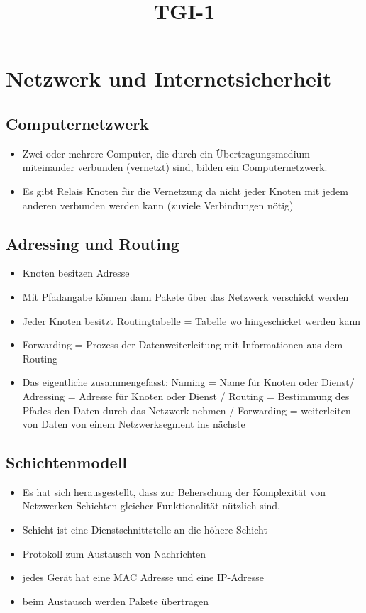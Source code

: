 \documentclass[a4paper,10pt]{scrartcl}
\title{TGI-1}
\author{}
\begin{document}
\section{Netzwerk und Internetsicherheit}

\subsection{Computernetzwerk}

\begin{itemize}
 \item Zwei oder mehrere Computer, die durch ein
Übertragungsmedium miteinander verbunden (vernetzt) sind, bilden ein Computernetzwerk. 
\item Es gibt Relais Knoten für die Vernetzung da nicht jeder Knoten mit jedem anderen verbunden werden kann (zuviele Verbindungen nötig)
\end{itemize}

\subsection{Adressing und Routing}

\begin{itemize}
 \item Knoten besitzen Adresse
 \item Mit Pfadangabe können dann Pakete über das Netzwerk verschickt werden
 \item Jeder Knoten besitzt Routingtabelle = Tabelle wo hingeschicket werden kann
 \item Forwarding = Prozess der Datenweiterleitung mit Informationen aus dem Routing
 \item Das eigentliche zusammengefasst: Naming = Name für Knoten oder Dienst/ Adressing = Adresse für Knoten oder Dienst / Routing = Bestimmung des Pfades den Daten durch
 das Netzwerk nehmen / Forwarding = weiterleiten von Daten von einem Netzwerksegment ins nächste
\end{itemize}

\subsection{Schichtenmodell}

\begin{itemize}
 \item Es hat sich herausgestellt, dass zur Beherschung der Komplexität von Netzwerken Schichten gleicher Funktionalität nützlich sind.
 \item Schicht ist eine Dienstschnittstelle an die höhere Schicht
 \item Protokoll zum Austausch von Nachrichten
 \item jedes Gerät hat eine MAC Adresse und eine IP-Adresse
 \item beim Austausch werden Pakete übertragen
\end{itemize}
\end{document}
